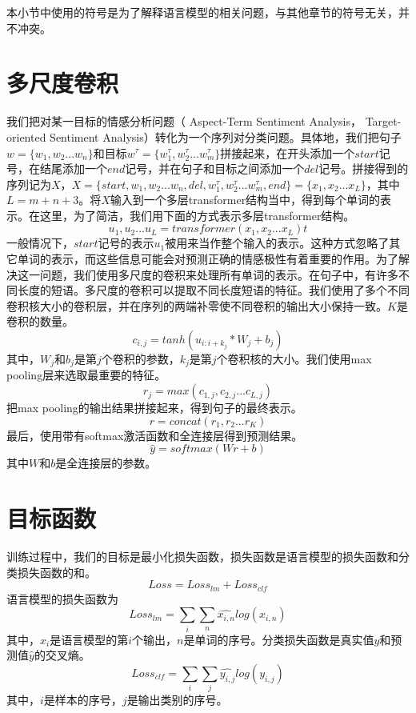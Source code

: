 本小节中使用的符号是为了解释语言模型的相关问题，与其他章节的符号无关，并不冲突。
\section{多尺度卷积}
我们把对某一目标的情感分析问题（ Aspect-Term Sentiment Analysis， Target-oriented Sentiment Analysis）转化为一个序列对分类问题。具体地，我们把句子$w=\{w_1,w_2...w_n\}$和目标$w^\tau=\{w^\tau_1,w^\tau_2...w^\tau_m\}$拼接起来，在开头添加一个$start$记号，在结尾添加一个$end$记号，并在句子和目标之间添加一个$del$记号。拼接得到的序列记为$X$，$X=\{start,w_1,w_2...w_n,del,w^\tau_1,w^\tau_2...w^\tau_m,end\}=\{x_1,x_2...x_L\}$，其中$L=m+n+3$。将$X$输入到一个多层transformer结构当中，得到每个单词的表示。在这里，为了简洁，我们用下面的方式表示多层transformer结构。
\begin{equation}
    u_1,u_2...u_L=transformer(x_1,x_2...x_L)t
\end{equation}
一般情况下，$start$记号的表示$u_1$被用来当作整个输入的表示。这种方式忽略了其它单词的表示，而这些信息可能会对预测正确的情感极性有着重要的作用。为了解决这一问题，我们使用多尺度的卷积来处理所有单词的表示。在句子中，有许多不同长度的短语。多尺度的卷积可以提取不同长度短语的特征。我们使用了多个不同卷积核大小的卷积层，并在序列的两端补零使不同卷积的输出大小保持一致。$K$是卷积的数量。
\begin{equation}
    c_{i,j}=tanh(u_{i:i+k_j}*W_j+b_j)
\end{equation}
其中，$W_j$和$b_j$是第$j$个卷积的参数，$k_j$是第$j$个卷积核的大小。我们使用max pooling层来选取最重要的特征。
\begin{equation}
    r_j=max(c_{1,j},c_{2,j}...c_{L,j})
\end{equation}
把max pooling的输出结果拼接起来，得到句子的最终表示。
\begin{equation}
    r=concat(r_1,r_2...r_K)
\end{equation}
最后，使用带有softmax激活函数和全连接层得到预测结果。
\begin{equation}
    \hat{y}=softmax(Wr+b)
\end{equation}
其中$W$和$b$是全连接层的参数。
\section{目标函数}
训练过程中，我们的目标是最小化损失函数，损失函数是语言模型的损失函数和分类损失函数的和。
\begin{equation}
    Loss=Loss_{lm}+Loss_{clf}
\end{equation}   
语言模型的损失函数为
\begin{equation}
    Loss_{lm}=\sum_{i}\sum_{n}\hat{x_{i,n}}log(x_{i,n})
\end{equation}
其中，$x_i$是语言模型的第$i$个输出，$n$是单词的序号。分类损失函数是真实值$y$和预测值$\hat{y}$的交叉熵。
\begin{equation}
    Loss_{clf}=\sum_{i}\sum
    _{j}\hat{y_{i,j}}log(y_{i,j})
\end{equation}
其中，$i$是样本的序号，$j$是输出类别的序号。
